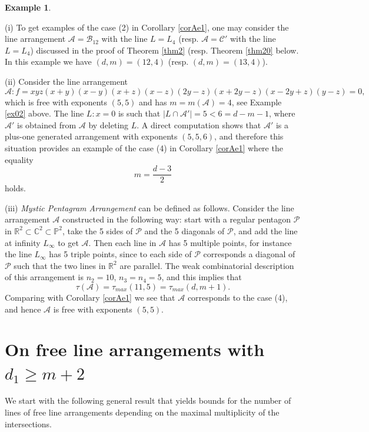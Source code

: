 \documentclass[12pt]{amsart}
\theoremstyle{plain}
\theoremstyle{definition}
\newtheorem{ex}[subsection]{Example}
\numberwithin{equation}{section}
\newcommand{\A}{{\mathcal A}}
\newcommand{\B}{{\mathcal B}}
\newcommand{\CC}{{\mathcal C}}
\newcommand{\PPP}{{\mathcal P}}
\newcommand{\R}{\mathbb{R}}
\newcommand{\C}{\mathbb{C}}
\newcommand{\PP}{\mathbb{P}}
\begin{document}
\endproof

 \begin{ex}
\label{exAe1}

(i) To get examples of the case (2) in Corollary \ref{corAe1}, one may consider the line arrangement $\A=\B_{12}$ with the line $L=L_4$ (resp. $\A=\CC'$ with the line $L=L_4$)
discussed in the proof of Theorem \ref{thm2} (resp. Theorem \ref{thm20} below. In this example we have $(d,m)=(12,4)$ (resp. $(d,m)=(13,4)$).

 (ii) Consider the line arrangement
$$\A: f=xyz(x+y)(x-y)(x+z)(x-z)(2y-z)(x+2y-z)(x-2y+z)(y-z)=0,$$
which is free with exponents $(5,5)$ and has $m=m(\A)=4$, see Example \ref{ex02} above.
The line $L:x=0$ is such that $|L \cap \A'|=5<6=d-m-1$, where $\A'$ is obtained from $\A$ by deleting $L$. A direct computation shows that
$\A'$ is a plus-one generated arrangement with exponents
$(5,5,6)$, and therefore this situation provides an example of the case (4) in Corollary \ref{corAe1} where the equality 
$$m = \frac{d-3}{2}$$
holds.

(iii) {\it Mystic Pentagram Arrangement } can be defined as follows.
Consider the line arrangement $\A$ constructed in the following way: start with a regular pentagon $\PPP$ in $\R^2 \subset \C^2 \subset \PP^2$, take the 5 sides of $\PPP$ and the 5 diagonals of $\PPP$, and add the line at infinity $L_{\infty}$ to get $\A$. Then each line in $\A$ has 5 multiple points, for instance the line $L_{\infty}$ has 5 triple points, since to  each side of $\PPP$ corresponds a diagonal of $\PPP$ such that the two lines in $\R^2$ are parallel. The weak combinatorial description of this arrangement is $n_2=10$, $n_3=n_4=5$, and this implies that
$$\tau(\A)=\tau_{max}(11,5)=\tau_{max}(d,m+1).$$
Comparing with Corollary \ref{corAe1} we see that $\A$ corresponds to the case (4), and hence $\A$ is free with exponents $(5,5)$.
\end{ex}

\section{On free line arrangements with \texorpdfstring{$d_1\geq m+2$}{}}\label{sec3}

We start with the following general result that yields bounds for the number of lines of free line arrangements depending on the maximal multiplicity of the intersections.
\end{document}
